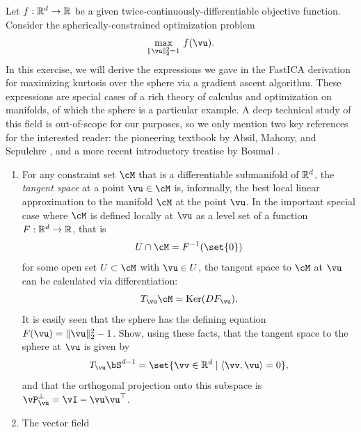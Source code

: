 \documentclass[../../book-main.tex]{subfiles}
\begin{document}
\begin{exercise}\label{exercise:sphere-calculus}
    Let $f : \mathbb{R}^d \to \mathbb{R}$ be a given twice-continuously-differentiable objective function. Consider the spherically-constrained optimization problem
    \begin{equation}\label{eq:exercise-sphere-constrained-max}
        \max_{\norm{\vu}_2^2 = 1}\, f(\vu). 
    \end{equation}
    In this exercise, we will derive the expressions we gave in the FastICA derivation for maximizing kurtosis over the sphere via a gradient ascent algorithm.
    These expressions are special cases of a rich theory of calculus and optimization on manifolds, of which the sphere is a particular example. A deep technical study of this field is out-of-scope for our purposes, so we only mention two key references for the interested reader: the pioneering textbook by Absil, Mahony, and Sepulchre
    \cite{Absil2009-nc}, and a more recent introductory treatise by Boumal \cite{Boumal2023-rj}. 
    \begin{enumerate}
        \item For any constraint set $\cM$ that is a differentiable submanifold of $\mathbb{R}^d$, the 
        \textit{tangent space} at a point $\vu \in \cM$ is, informally, the best local linear approximation to the manifold $\cM$ at the point $\vu$.
        In the important special case where $\cM$ is defined locally at $\vu$ as a level set of a function $F : \mathbb{R}^d \to \mathbb{R}$,
        that is
        \begin{equation*}
            U \cap \cM = F^{-1}(\set{0})
        \end{equation*}
        for some open set $U \subset \cM$ with $\vu \in U$,
        the tangent space to $\cM$ at $\vu$ can be calculated 
        via differentiation:
        \begin{equation*}
            T_{\vu} \cM = \Ker(DF_{\vu}).
        \end{equation*}
        It is easily seen that the sphere has the defining equation $F(\vu) = \norm{\vu}_2^2 - 1$.
        Show, using these facts, that the tangent space to the sphere at $\vu$ is given by
        \begin{equation*}
            T_{\vu} \bS^{d-1} = \set{\vv \in \R^d \given \ip{\vv}{\vu} = 0},
        \end{equation*}
        and that the orthogonal projection onto this subspace is $\vP_{\vu}^\perp = \vI - \vu\vu^\top$.
        \item The vector field 
        \begin{equation}\label{eq:exercise-riemann-grad-sphere}

\end{equation}
\end{enumerate}
\end{exercise}
\end{document}
